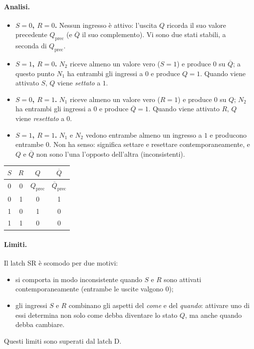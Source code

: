 \documentclass[11pt,a4paper]{article}
\begin{document}
\paragraph{Analisi.}
\begin{itemize}
  \item \textbf{$S = 0$, $R = 0$.} Nessun ingresso è attivo: l'uscita $Q$ ricorda il suo valore precedente $Q_{\mathrm{prec}}$ (e $\overline{Q}$ il suo complemento). Vi sono due stati stabili, a seconda di $Q_{\mathrm{prec}}$.
  \item \textbf{$S = 1$, $R = 0$.} $N_2$ riceve almeno un valore vero ($S = 1$) e produce $0$ su $\overline{Q}$; a questo punto $N_1$ ha entrambi gli ingressi a $0$ e produce $Q = 1$. Quando viene attivato $S$, $Q$ viene \emph{settato} a $1$.
  \item \textbf{$S = 0$, $R = 1$.} $N_1$ riceve almeno un valore vero ($R = 1$) e produce $0$ su $Q$; $N_2$ ha entrambi gli ingressi a $0$ e produce $\overline{Q} = 1$. Quando viene attivato $R$, $Q$ viene \emph{resettato} a $0$.
  \item \textbf{$S = 1$, $R = 1$.} $N_1$ e $N_2$ vedono entrambe almeno un ingresso a $1$ e producono entrambe $0$. Non ha senso: significa settare e resettare contemporaneamente, e $Q$ e $\overline{Q}$ non sono l'una l'opposto dell'altra (inconsistenti).
\end{itemize}

\begin{center}
\begin{tabular}{cc|cc}
\toprule
$S$ & $R$ & $Q$ & $\overline{Q}$ \\
\midrule
0 & 0 & $Q_{\mathrm{prec}}$ & $\overline{Q}_{\mathrm{prec}}$ \\
0 & 1 & 0 & 1 \\
1 & 0 & 1 & 0 \\
1 & 1 & 0 & 0 \\
\bottomrule
\end{tabular}
\end{center}

\paragraph{Limiti.} Il latch SR è scomodo per due motivi:
\begin{itemize}
  \item si comporta in modo inconsistente quando $S$ e $R$ sono attivati contemporaneamente (entrambe le uscite valgono $0$);
  \item gli ingressi $S$ e $R$ combinano gli aspetti del \emph{come} e del \emph{quando}: attivare uno di essi determina non solo come debba diventare lo stato $Q$, ma anche quando debba cambiare.
\end{itemize}
Questi limiti sono superati dal latch D.
\end{document}
